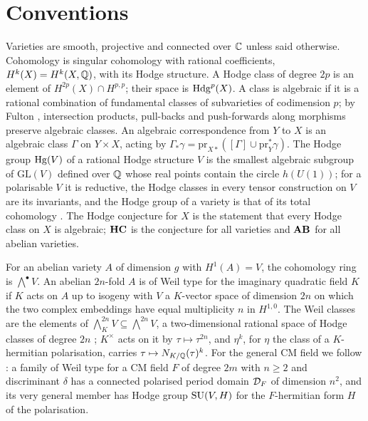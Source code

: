 \section{Conventions}\label{sec:conventions}

Varieties are smooth, projective and connected over $\mathbb{C}$ unless said otherwise. Cohomology is singular cohomology with rational coefficients, $H^{k}(X)=H^{k}(X,\mathbb{Q})$, with its Hodge structure. A Hodge class of degree $2p$ is an element of $H^{2p}(X)\cap H^{p,p}$; their space is $\mathrm{Hdg}^{p}(X)$. A class is algebraic if it is a rational combination of fundamental classes of subvarieties of codimension $p$; by Fulton \cite{Ful98}, intersection products, pull-backs and push-forwards along morphisms preserve algebraic classes. An algebraic correspondence from $Y$ to $X$ is an algebraic class $\Gamma$ on $Y\times X$, acting by $\Gamma_{*}\gamma=\mathrm{pr}_{X*}([\Gamma]\cup\mathrm{pr}_{Y}^{*}\gamma)$. The Hodge group $\mathrm{Hg}(V)$ of a rational Hodge structure $V$ is the smallest algebraic subgroup of $\mathrm{GL}(V)$ defined over $\mathbb{Q}$ whose real points contain the circle $h(U(1))$; for a polarisable $V$ it is reductive, the Hodge classes in every tensor construction on $V$ are its invariants, and the Hodge group of a variety is that of its total cohomology \cite{Del82}. The Hodge conjecture for $X$ is the statement that every Hodge class on $X$ is algebraic; $\mathbf{HC}$ is the conjecture for all varieties and $\mathbf{AB}$ for all abelian varieties.

For an abelian variety $A$ of dimension $g$ with $H^{1}(A)=V$, the cohomology ring is $\bigwedge^{\bullet}V$. An abelian $2n$-fold $A$ is of Weil type for the imaginary quadratic field $K$ if $K$ acts on $A$ up to isogeny with $V$ a $K$-vector space of dimension $2n$ on which the two complex embeddings have equal multiplicity $n$ in $H^{1,0}$. The Weil classes are the elements of $\bigwedge^{2n}_{K}V\subseteq\bigwedge^{2n}V$, a two-dimensional rational space of Hodge classes of degree $2n$ \cite{Weil77}; $K^{\times}$ acts on it by $\tau\mapsto\tau^{2n}$, and $\eta^{k}$, for $\eta$ the class of a $K$-hermitian polarisation, carries $\tau\mapsto N_{K/\mathbb{Q}}(\tau)^{k}$. For the general CM field we follow \cite{BMB26}: a family of Weil type for a CM field $F$ of degree $2m$ with $n\ge2$ and discriminant $\delta$ has a connected polarised period domain $\mathcal{D}_{F}$ of dimension $n^{2}$, and its very general member has Hodge group $\mathrm{SU}(V,H)$ for the $F$-hermitian form $H$ of the polarisation.

